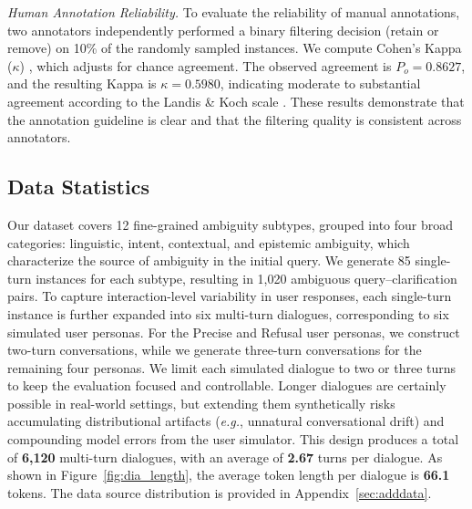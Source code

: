 \documentclass[sigconf]{acmart}
\begin{document}
\textit{Human Annotation Reliability.}
To evaluate the reliability of manual annotations, two annotators independently performed a binary filtering decision (retain or remove) on 10\% of the randomly sampled instances. We compute Cohen's Kappa ($\kappa$) \citep{cohen1960coefficient}, which adjusts for chance agreement. The observed agreement is $P_o = 0.8627$, and the resulting Kappa is $\kappa = 0.5980$, indicating moderate to substantial agreement according to the Landis \& Koch scale \citep{landis1977measurement}. These results demonstrate that the annotation guideline is clear and that the filtering quality is consistent across annotators.







\subsection{Data Statistics}
Our dataset covers 12 fine-grained ambiguity subtypes, grouped into four broad categories: linguistic, intent, contextual, and epistemic ambiguity, which characterize the source of ambiguity in the initial query.  
We generate 85 single-turn instances for each subtype, resulting in 1,020 ambiguous query–clarification pairs.
To capture interaction-level variability in user responses, each single-turn instance is further expanded into six multi-turn dialogues, corresponding to six simulated user personas.  
For the Precise and Refusal user personas, we construct two-turn conversations, while we generate three-turn conversations for the remaining four personas.
We limit each simulated dialogue to two or three turns to keep the evaluation focused and controllable.
Longer dialogues are certainly possible in real-world settings, but extending them synthetically risks accumulating distributional artifacts (\textit{e.g.}, unnatural conversational drift) and compounding model errors from the user simulator.
This design produces a total of \textbf{6,120} multi-turn dialogues, with an average of \textbf{2.67} turns per dialogue.
As shown in Figure~\ref{fig:dia_length}, the average token length per dialogue is \textbf{66.1} tokens.
The data source distribution is provided in Appendix~\ref{sec:adddata}.

\end{document}

